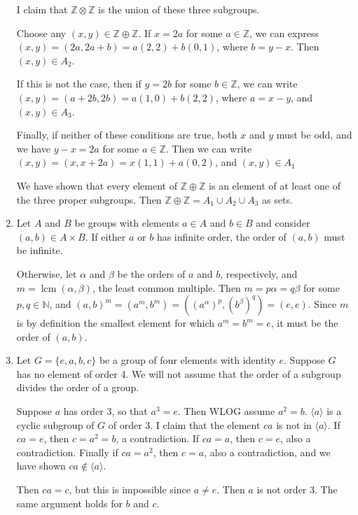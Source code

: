 \documentclass[11pt, reqno]{article}
\begin{document}
\begin{enumerate}
    I claim that 
    $\mathbb{Z}\otimes\mathbb{Z}$ is the union of these three subgroups. 

    Choose any $(x,y) \in \mathbb{Z}\oplus\mathbb{Z}$. If $x = 2a$ for some $a \in \mathbb{Z}$,
    we can express $(x,y) = (2a, 2a + b) = a(2,2) + b(0,1)$, where $b = y-x$. Then $(x,y) \in A_2$.

    If this is not the case, then if $y = 2b$ for some $b \in \mathbb{Z}$, we can 
    write $(x,y) = (a + 2b, 2b) = a(1,0) + b(2,2)$, where $a = x-y$, and $(x,y) \in A_3$.

    Finally, if neither of these conditions are true, both $x$ and $y$ must be odd, and 
    we have $y - x = 2a$ for some $a \in \mathbb{Z}$. Then we can write 
    $(x,y) = (x, x + 2a) = x(1,1) + a(0,2)$, and $(x,y) \in A_1$
    
    We have shown that every element of $\mathbb{Z}\oplus\mathbb{Z}$ is an element of at least 
    one of the three proper subgroups. Then $\mathbb{Z}\oplus\mathbb{Z} = A_1 \cup A_2 \cup A_3$
    as sets.

    \item Let $A$ and $B$ be groups with elements $a \in A$ and $b \in B$ and consider $(a,b) \in A\times B$. 
    If either $a$ or $b$ has infinite order, the order of $(a,b)$ must be infinite. 
    
    Otherwise, let $\alpha$ and $\beta$ be the orders of $a$ and $b$, respectively, 
    and $m = \operatorname{lcm}(\alpha, \beta)$, the least common multiple. 
    Then $m = p\alpha = q\beta$ for some $p,q \in \mathbb{N}$, and $(a,b)^m = (a^m, b^m) = ({(a^\alpha)}^p, {(b^\beta)}^q)
    = (e,e)$. Since $m$ is by definition the smallest element for which $a^m = b^m = e$, it must be the order of $(a,b)$.

    \item Let $G = \{e, a, b, c\}$ be a group of four elements with identity $e$. Suppose $G$ has no element of order
    4. We will not assume that the order of a subgroup divides the order of a group.

    Suppose $a$ has order 3, so that $a^3 = e$. Then WLOG assume $a^2 = b$. $\langle a \rangle$ is a cyclic subgroup
    of $G$ of order 3. I claim that the element $ca$ is not in $\langle a \rangle$. If $ca = e$, then $c = a^2 = b$,
    a contradiction. If $ca = a$, then $c = e$, also a contradiction. Finally if $ca = a^2$, then $c = a$, also a 
    contradiction, and we have shown $ca \notin \langle a \rangle$.

    Then $ca = c$, but this is impossible since $a \neq e$. Then $a$ is not order $3$. The same argument holds for $b$ and $c$.


\end{enumerate}
\end{document}
